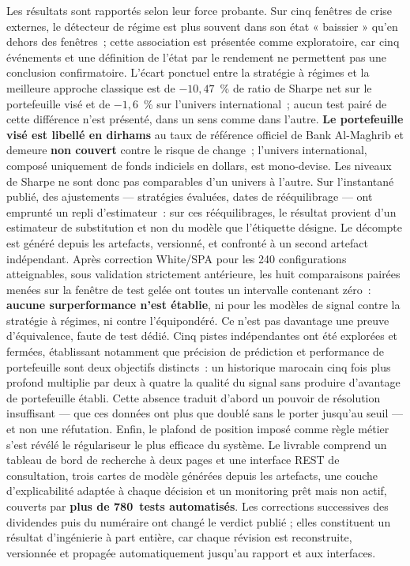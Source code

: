 Les résultats sont rapportés selon leur force probante. Sur cinq fenêtres de
crise externes, le détecteur de régime est plus souvent dans son état « baissier »
qu'en dehors des fenêtres~; cette association est présentée comme exploratoire,
car cinq événements et une définition de l'état par le rendement ne permettent
pas une conclusion confirmatoire. L'écart ponctuel entre la stratégie à
régimes et la meilleure approche classique est de $-10{,}47$~\% de ratio de
Sharpe net sur le portefeuille visé et de $-1{,}6$~\% sur l'univers
international~; aucun test pairé de cette différence n'est présenté, dans un sens
comme dans l'autre. \textbf{Le portefeuille visé est libellé en dirhams} au taux
de référence officiel de Bank Al-Maghrib et demeure \textbf{non couvert} contre
le risque de change~; l'univers international, composé uniquement de fonds
indiciels en dollars, est mono-devise. Les niveaux de Sharpe ne sont donc pas
comparables d'un univers à l'autre. Sur l'instantané publié,
\integriteReplis{} des \integriteAjustements{} ajustements — \integriteStrategies{}
stratégies évaluées, \integriteDates{} dates de rééquilibrage — ont emprunté un
repli d'estimateur~: sur ces rééquilibrages, le résultat provient d'un estimateur
de substitution et non du modèle que l'étiquette désigne. Le décompte est
généré depuis les artefacts, versionné, et confronté à un second artefact
indépendant. Après correction White/SPA pour les 240 configurations
atteignables, sous validation strictement antérieure, les huit
comparaisons pairées menées sur la fenêtre de test gelée ont toutes un intervalle
contenant zéro~: \textbf{aucune surperformance n'est établie}, ni pour les
modèles de signal contre la stratégie à régimes, ni contre l'équipondéré. Ce
n'est pas davantage une preuve d'équivalence, faute de test dédié. Cinq pistes indépendantes ont
été explorées et fermées, établissant notamment que précision de prédiction et
performance de portefeuille sont deux objectifs distincts~: un historique
marocain cinq fois plus profond multiplie par deux à quatre la qualité du signal
sans produire d'avantage de portefeuille établi. Cette absence traduit d'abord un
pouvoir de résolution insuffisant — que ces données ont plus que doublé sans le
porter jusqu'au seuil — et non une réfutation. Enfin, le plafond de
position imposé comme règle métier s'est révélé le régulariseur le plus efficace
du système. Le livrable comprend un tableau de bord de recherche à deux pages et
une interface REST de consultation, trois cartes de modèle générées depuis les
artefacts, une couche d'explicabilité adaptée à chaque décision et un monitoring
prêt mais non actif, couverts par \textbf{plus de 780~tests automatisés}. Les corrections
successives des dividendes puis du numéraire ont changé le verdict publié ;
elles constituent un résultat d'ingénierie à part entière, car chaque révision
est reconstruite, versionnée et propagée automatiquement jusqu'au rapport et
aux interfaces.

